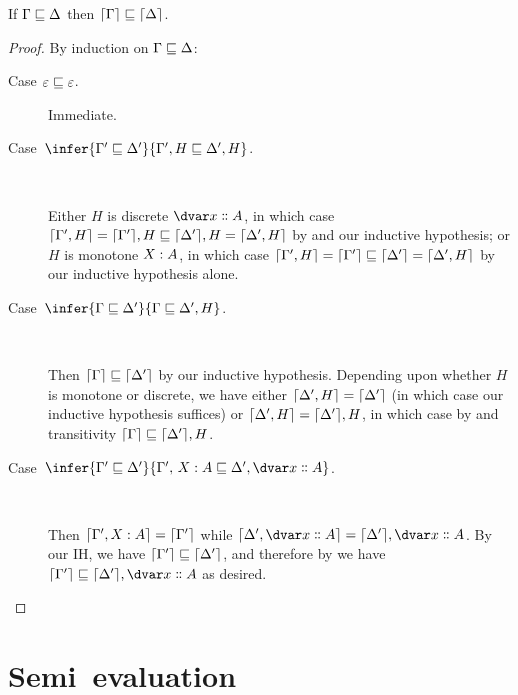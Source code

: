 
\nextlemma
\begin{lemma}\label{lemma-weakening-strip-context}
  If $\Gamma \sqsubseteq \Delta$ then $\lceil{\Gamma}\rceil \sqsubseteq \lceil{\Delta}\rceil$.
\end{lemma}
\begin{proof}
  By induction on $\Gamma \sqsubseteq \Delta$:

  \begin{description}
    \item[Case $\varepsilon \sqsubseteq \varepsilon$.] Immediate.

  \item[Case\, $\infer{\Gamma' \weaker \Delta'}{\Gamma',H \weaker \Delta',H}$.]\

    Either $H$ is discrete $\hd x A$, in which case $\lceil{\Gamma',H}\rceil =
    \lceil{\Gamma'}\rceil, H \sqsubseteq \lceil{\Delta'}\rceil, H = \lceil{\Delta',H}\rceil$ by
     and our inductive hypothesis; or $H$ is monotone $\hm x A$, in
    which case $\lceil{\Gamma',H}\rceil = \lceil{\Gamma'}\rceil \sqsubseteq \lceil{\Delta'}\rceil = \lceil{\Delta',H}\rceil$ by our inductive hypothesis alone.

  \item[Case\, $\infer{\Gamma \weaker \Delta'}{\Gamma \weaker \Delta',H}$.]\

    Then $\lceil{\Gamma}\rceil \sqsubseteq \lceil{\Delta'}\rceil$ by our inductive
    hypothesis. Depending upon whether $H$ is monotone or discrete, we have
    either $\lceil{\Delta', H}\rceil = \lceil{\Delta'}\rceil$ (in which case our
    inductive hypothesis suffices) or $\lceil{\Delta', H}\rceil = \lceil{\Delta'}\rceil,
    H$, in which case by  and transitivity $\lceil{\Gamma}\rceil
    \sqsubseteq \lceil{\Delta'}\rceil, H$. 

  \item[Case\, $\infer{\Gamma' \weaker \Delta'}{\Gamma',\,\hm x A \weaker
      \Delta',\hd x A}$.]\

    Then $\stripcx{\Gamma', \hm x A} = \stripcx{\Gamma'}$ while
    $\stripcx{\Delta', \hd x A} = \stripcx{\Delta'}, \hd x A$. By our IH, we
    have $\lceil{\Gamma'}\rceil \sqsubseteq \lceil{\Delta'}\rceil$, and therefore by
     we have $\stripcx{\Gamma'} \weaker \stripcx{\Delta'}, \hd x A$ as
    desired.
  \end{description}
\end{proof}


\section{Semi\naive\ evaluation}
\label{appendix-seminaive}

